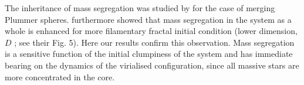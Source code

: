 The inheritance of mass segregation was studied by \cite{McMillan2007} for the case of merging Plummer spheres. \cite{Allison2010} furthermore showed that mass segregation in the system as a whole is enhanced for more filamentary  fractal initial condition (lower dimension, $D$ ; see their Fig. 5). Here our results confirm this observation. Mass segregation is a sensitive function of the initial clumpiness of the system and has immediate bearing on the dynamics of the virialised configuration, since all massive stars are more concentrated in the core.